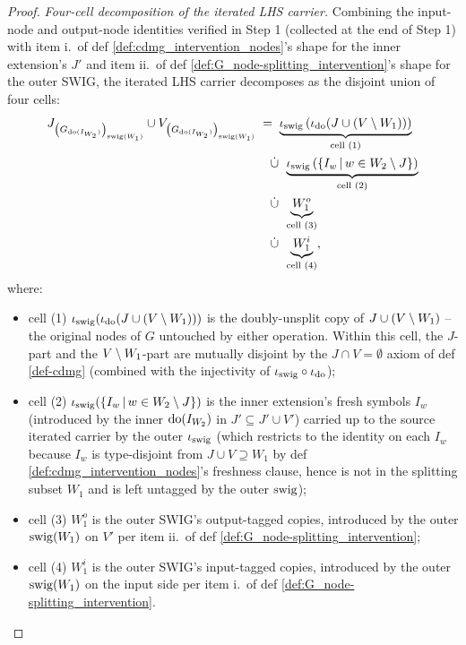 \documentclass[main]{subfiles}
\begin{document}
\begin{proof}
\smallskip\noindent\emph{Four-cell decomposition of the iterated LHS carrier.}
Combining the input-node and output-node identities verified in Step 1 (collected at the end of Step 1) with item i.\ of def \ref{def:cdmg_intervention_nodes}'s shape for the inner extension's $J'$ and item ii.\ of def \ref{def:G_node-splitting_intervention}'s shape for the outer SWIG, the iterated LHS carrier decomposes as the disjoint union of four cells:
\begin{align*}
    J_{\left ( G_{\operatorname{do}(I_{W_2})} \right )_{\mathrm{swig}(W_1)}} \cup V_{\left ( G_{\operatorname{do}(I_{W_2})} \right )_{\mathrm{swig}(W_1)}}
        &\;=\; \underbrace{\iota_{\mathrm{swig}}\left (\iota_{\operatorname{do}}(J \cup (V \setminus W_1))\right )}_{\text{cell (1)}} \\
        &\quad\,\dot{\cup}\,\; \underbrace{\iota_{\mathrm{swig}}\left (\left \{ I_w \,\middle|\, w \in W_2 \setminus J \right \}\right )}_{\text{cell (2)}} \\
        &\quad\,\dot{\cup}\,\; \underbrace{W_1^o}_{\text{cell (3)}} \\
        &\quad\,\dot{\cup}\,\; \underbrace{W_1^i}_{\text{cell (4)}},
\end{align*}
where:
\begin{itemize}
    \item cell (1) $\iota_{\mathrm{swig}}(\iota_{\operatorname{do}}(J \cup (V \setminus W_1)))$ is the doubly-unsplit copy of $J \cup (V \setminus W_1)$ -- the original nodes of $G$ untouched by either operation. Within this cell, the $J$-part and the $V \setminus W_1$-part are mutually disjoint by the $J \cap V = \emptyset$ axiom of def \ref{def-cdmg} (combined with the injectivity of $\iota_{\mathrm{swig}} \circ \iota_{\operatorname{do}}$);
    \item cell (2) $\iota_{\mathrm{swig}}(\left \{ I_w \,\middle|\, w \in W_2 \setminus J \right \})$ is the inner extension's fresh symbols $I_w$ (introduced by the inner $\operatorname{do}(I_{W_2})$ in $J' \subseteq J' \cup V'$) carried up to the source iterated carrier by the outer $\iota_{\mathrm{swig}}$ (which restricts to the identity on each $I_w$ because $I_w$ is type-disjoint from $J \cup V \supseteq W_1$ by def \ref{def:cdmg_intervention_nodes}'s freshness clause, hence is not in the splitting subset $W_1$ and is left untagged by the outer $\mathrm{swig}$);
    \item cell (3) $W_1^o$ is the outer SWIG's output-tagged copies, introduced by the outer $\mathrm{swig}(W_1)$ on $V'$ per item ii.\ of def \ref{def:G_node-splitting_intervention};
    \item cell (4) $W_1^i$ is the outer SWIG's input-tagged copies, introduced by the outer $\mathrm{swig}(W_1)$ on the input side per item i.\ of def \ref{def:G_node-splitting_intervention}.
\end{itemize}


\end{proof}
\end{document}
